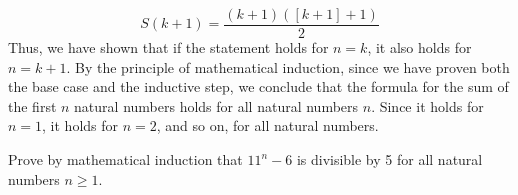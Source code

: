 \begin{answer}
    \begin{equation*}
        S(k+1) = \frac{(k+1)\left([k + 1] + 1\right)}{2}
    \end{equation*}
    Thus, we have shown that if the statement holds for $n=k$, it also holds for $n=k+1$.
    \newline\newline
    By the principle of mathematical induction, since we have proven both the base case and the inductive step,
    we conclude that the formula for the sum of the first $n$ natural numbers holds for all natural numbers $n$.
    Since it holds for $n=1$, it holds for $n=2$, and so on, for all natural numbers.
\end{answer}

\begin{exercise}
    Prove by mathematical induction that $11^n - 6$ is divisible by 5 for all natural numbers $n \geq 1$.
\end{exercise}
